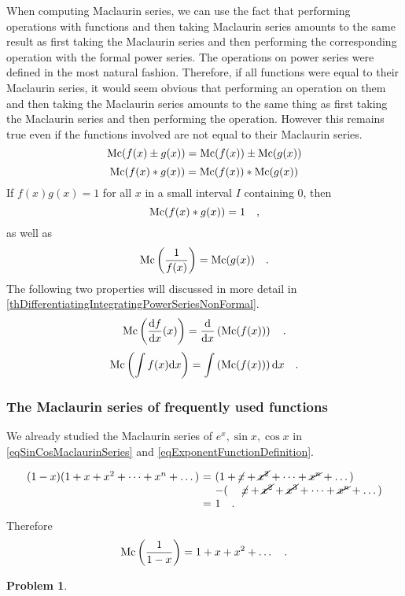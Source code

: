 \documentclass[12pt]{book}
\newtheorem{problem}[theorem]{Problem}
\begin{document}
When computing Maclaurin series, we can use the fact that performing operations with functions and then taking Maclaurin series amounts to the same result as first taking the Maclaurin series and then performing the corresponding operation with the formal power series. The operations on power series were defined in the most natural fashion. Therefore, if all functions were equal to their Maclaurin series, it would seem obvious that performing an operation on them and then taking the Maclaurin series amounts to the same thing as first taking the Maclaurin series and then performing the operation. However this remains true even if the functions involved are not equal to their Maclaurin series. 
\[
\operatorname{{\normalfont{Mc}}} (f(x)\pm g(x))= \operatorname{{\normalfont{Mc}}} (f(x))\pm \operatorname{{\normalfont{Mc}}}(g(x))
\]
\[
\operatorname{{\normalfont{Mc}}} (f(x)* g(x))= \operatorname{{\normalfont{Mc}}} (f(x))* \operatorname{{\normalfont{Mc}}}(g(x))
\]
If $f(x)g(x)=1$ for all $x$ in a small interval $I$ containing $0$, then
\[
\operatorname{{\normalfont{Mc}}} (f(x)*g(x))= 1\quad,
\]
as well as
\[
\operatorname{{\normalfont{Mc}}}\left(\frac{1}{f(x)}\right)= \operatorname{{\normalfont{Mc}}}(g(x))\quad .
\]
The following two properties will discussed in more detail in \ref{thDifferentiatingIntegratingPowerSeriesNonFormal}.
\[
\operatorname{{\normalfont{Mc}}} \left(\frac{{\normalfont \text{d}} f}{{\normalfont \text{d}} x}(x)\right)= \frac{{\normalfont \text{d}} }{{\normalfont \text{d}} x} \left( \operatorname{{\normalfont{Mc}}}(f(x)) \right)\quad .
\]
\[
\operatorname{{\normalfont{Mc}}} \left(\int f(x){\normalfont \text{d}} x \right) = \int\left( \operatorname{{\normalfont{Mc}}}( f(x) ) \right) {\normalfont \text{d}} x \quad .
\]
\subsubsection{The Maclaurin series of frequently used functions}
We already studied the Maclaurin series of $e^x, \sin x, \cos x$ in \eqref{eqSinCosMaclaurinSeries} and \eqref{eqExponentFunctionDefinition}.

\[
\begin{array}{r@{~}c@{~}l}
(1-x)(1+x+x^2+\dots +x^n+\dots) &=& (1+\cancel{x}+\cancel{x^2}+\dots +\cancel{x^n} +\dots)\\
&& -(\phantom{1+}\cancel{x}+\cancel{x^2}+\cancel{x^3}+\dots + \cancel{x^n}+\dots)\\
&=& 1\quad .
\end{array}
\]
Therefore
\begin{equation}\label{eqInfiniteGeometricProgression}
\operatorname{{\normalfont{Mc}}} \left( \frac{1}{1-x}\right)= 1+x+x^2+\dots \quad .
\end{equation}

\begin{problem}

\end{problem}

\end{document}
